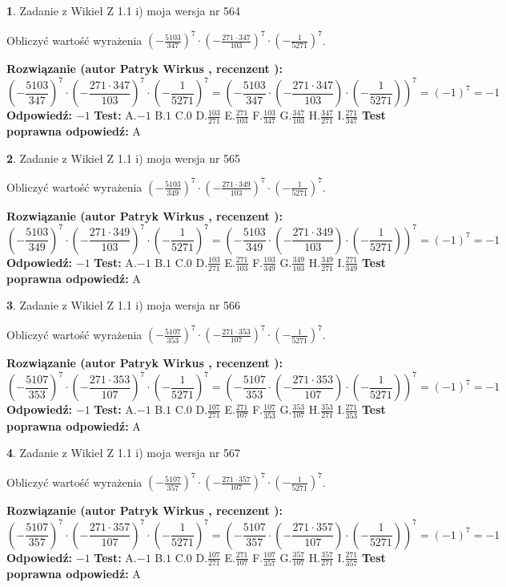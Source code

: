 \documentclass[12pt, a4paper]{article}
\theoremstyle{definition} %
\newtheorem{zad}{}
\newcommand{\zadStart}[1]{\begin{zad}#1\newline}
\newcommand{\zadStop}{\end{zad}}
\newcommand{\rozwStart}[2]{\noindent \textbf{Rozwiązanie (autor #1 , recenzent #2): }\newline}
\newcommand{\rozwStop}{\newline}
\newcommand{\odpStart}{\noindent \textbf{Odpowiedź:}\newline}
\newcommand{\odpStop}{\newline}
\newcommand{\testStart}{\noindent \textbf{Test:}\newline}
\newcommand{\testStop}{\newline}
\newcommand{\kluczStart}{\noindent \textbf{Test poprawna odpowiedź:}\newline}
\newcommand{\kluczStop}{\newline}
\begin{document}
\zadStart{Zadanie z Wikieł Z 1.1 i) moja wersja nr 564}

Obliczyć wartość wyrażenia $(-\frac{5103}{347})^{7} \cdot (-\frac{271 \cdot 347}{103})^{7} \cdot (-\frac{1}{5271})^{7}$.
\zadStop
\rozwStart{Patryk Wirkus}{}
$$(-\frac{5103}{347})^{7} \cdot (-\frac{271 \cdot 347}{103})^{7} \cdot (-\frac{1}{5271})^{7} = (-\frac{5103}{347} \cdot (-\frac{271 \cdot 347}{103}) \cdot (-\frac{1}{5271}))^{7} = (-1)^{7} = -1$$
\rozwStop
\odpStart
$-1$
\odpStop
\testStart
A.$-1$ B.$1$ C.$0$ D.$\frac{103}{271}$ E.$\frac{271}{103}$
F.$\frac{103}{347}$ G.$\frac{347}{103}$
H.$\frac{347}{271}$
I.$\frac{271}{347}$
\testStop
\kluczStart
A
\kluczStop



\zadStart{Zadanie z Wikieł Z 1.1 i) moja wersja nr 565}

Obliczyć wartość wyrażenia $(-\frac{5103}{349})^{7} \cdot (-\frac{271 \cdot 349}{103})^{7} \cdot (-\frac{1}{5271})^{7}$.
\zadStop
\rozwStart{Patryk Wirkus}{}
$$(-\frac{5103}{349})^{7} \cdot (-\frac{271 \cdot 349}{103})^{7} \cdot (-\frac{1}{5271})^{7} = (-\frac{5103}{349} \cdot (-\frac{271 \cdot 349}{103}) \cdot (-\frac{1}{5271}))^{7} = (-1)^{7} = -1$$
\rozwStop
\odpStart
$-1$
\odpStop
\testStart
A.$-1$ B.$1$ C.$0$ D.$\frac{103}{271}$ E.$\frac{271}{103}$
F.$\frac{103}{349}$ G.$\frac{349}{103}$
H.$\frac{349}{271}$
I.$\frac{271}{349}$
\testStop
\kluczStart
A
\kluczStop



\zadStart{Zadanie z Wikieł Z 1.1 i) moja wersja nr 566}

Obliczyć wartość wyrażenia $(-\frac{5107}{353})^{7} \cdot (-\frac{271 \cdot 353}{107})^{7} \cdot (-\frac{1}{5271})^{7}$.
\zadStop
\rozwStart{Patryk Wirkus}{}
$$(-\frac{5107}{353})^{7} \cdot (-\frac{271 \cdot 353}{107})^{7} \cdot (-\frac{1}{5271})^{7} = (-\frac{5107}{353} \cdot (-\frac{271 \cdot 353}{107}) \cdot (-\frac{1}{5271}))^{7} = (-1)^{7} = -1$$
\rozwStop
\odpStart
$-1$
\odpStop
\testStart
A.$-1$ B.$1$ C.$0$ D.$\frac{107}{271}$ E.$\frac{271}{107}$
F.$\frac{107}{353}$ G.$\frac{353}{107}$
H.$\frac{353}{271}$
I.$\frac{271}{353}$
\testStop
\kluczStart
A
\kluczStop



\zadStart{Zadanie z Wikieł Z 1.1 i) moja wersja nr 567}

Obliczyć wartość wyrażenia $(-\frac{5107}{357})^{7} \cdot (-\frac{271 \cdot 357}{107})^{7} \cdot (-\frac{1}{5271})^{7}$.
\zadStop
\rozwStart{Patryk Wirkus}{}
$$(-\frac{5107}{357})^{7} \cdot (-\frac{271 \cdot 357}{107})^{7} \cdot (-\frac{1}{5271})^{7} = (-\frac{5107}{357} \cdot (-\frac{271 \cdot 357}{107}) \cdot (-\frac{1}{5271}))^{7} = (-1)^{7} = -1$$
\rozwStop
\odpStart
$-1$
\odpStop
\testStart
A.$-1$ B.$1$ C.$0$ D.$\frac{107}{271}$ E.$\frac{271}{107}$
F.$\frac{107}{357}$ G.$\frac{357}{107}$
H.$\frac{357}{271}$
I.$\frac{271}{357}$
\testStop
\kluczStart
A
\kluczStop
\end{document}
